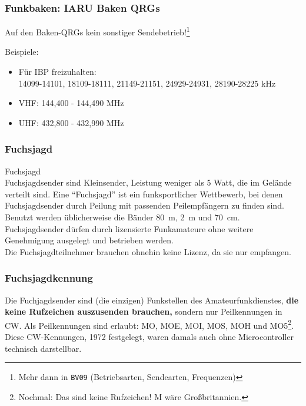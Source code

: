 \begin{frame}
  \frametitle{Funkbaken: IARU Baken QRGs}

  \begin{center}
    \Large Auf den Baken-QRGs kein sonstiger Sendebetrieb!\footnote{Mehr dann in \texttt{BV09} (Betriebsarten, Sendearten, Frequenzen)}
  \end{center}

  Beispiele:
    
  \begin{itemize}

    \item Für IBP freizuhalten:\\
    14099-14101, 18109-18111, 21149-21151, 24929-24931, 28190-28225 kHz

    \item VHF: 144,400 - 144,490 MHz
    
    \item UHF: 432,800 - 432,990 MHz
  \end{itemize}
\end{frame}

\begin{frame}
  \frametitle{Fuchsjagd}

  {\Large Fuchsjagd}\\[1.5em]

  Fuchsjagdsender sind Kleinsender, Leistung weniger als 5 Watt, die
  im Gelände verteilt sind.  Eine ``Fuchsjagd'' ist ein
  funksportlicher Wettbewerb, bei denen Fuchsjagdsender durch Peilung
  mit passenden Peilempfängern zu finden sind.  Benutzt werden
  üblicherweise die Bänder 80~m, 2~m und 70~cm.\\[1.5em]

  Fuchsjagdsender dürfen durch lizensierte Funkamateure ohne weitere
  Genehmigung ausgelegt und betrieben werden.\\[1.5em]

  Die Fuchsjagdteilnehmer brauchen ohnehin keine Lizenz, da sie nur empfangen.

\end{frame}

\begin{frame}

\frametitle{Fuchsjagdkennung}

  Die Fuchjagdsender sind (die einzigen) Funkstellen des
  Amateurfunkdienstes, \textbf{die keine Rufzeichen auszusenden
  brauchen,} sondern nur Peilkennungen in CW.  Als Peilkennungen sind
  erlaubt: MO, MOE, MOI, MOS, MOH und MO5\footnote{Nochmal: Das sind
  keine Rufzeichen! M wäre Großbritannien.}.\\[1.5em]

  Diese CW-Kennungen, 1972 festgelegt, waren damals auch ohne
  Microcontroller technisch darstellbar.

\end{frame}

